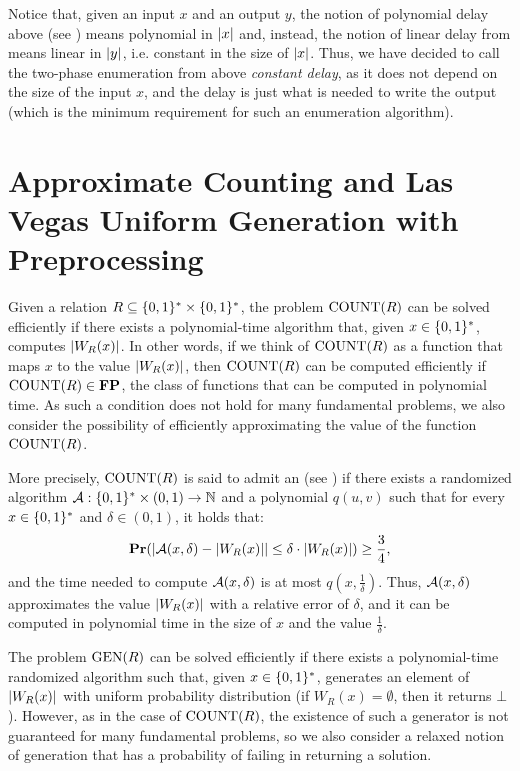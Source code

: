 \documentclass[11pt,twoside=off,numbers=noenddot]{scrbook}
\begin{document}
Notice that, given an input $x$ and an output $y$, the notion of polynomial delay above (see ) means polynomial in $| x |$ and, instead, the notion of linear delay from \cite{bagan2006mso,courcelle2009linear} means linear in $| y |$, i.e. constant in the size of $| x |$. Thus, we have decided to call the two-phase enumeration from above \emph{constant delay}, as it does not depend on the size of the input $x$, and the delay is just what is needed to write the output (which is the minimum requirement for such an enumeration algorithm).

\section{Approximate Counting and Las Vegas Uniform Generation with Preprocessing}
Given a relation $R \subseteq \{ 0, 1 \}^\ast \times \{ 0, 1 \}^\ast$, the problem $\text{COUNT}(R)$ can be solved efficiently if there exists a polynomial-time algorithm that, given $x \in \{ 0, 1 \}^\ast$, computes $| W_R(x) |$. In other words, if we think of $\text{COUNT}(R)$ as a function that maps $x$ to the value $| W_R(x) |$, then $\text{COUNT}(R)$ can be computed efficiently if $\text{COUNT}(R) \in \textbf{FP}$, the class of functions that can be computed in polynomial time. As such a condition does not hold for many fundamental problems, we also consider the possibility of efficiently approximating the value of the function $\text{COUNT}(R)$.

\begin{definition}[FPRAS]
    More precisely, $\text{COUNT}(R)$ is said to admit an  (see \cite{jerrum1986random}) if there exists a randomized algorithm $\mathcal{A} : \{ 0, 1 \}^\ast \times (0, 1) \to \mathbb N$ and a polynomial $q(u, v)$ such that for every $x \in \{ 0, 1 \}^\ast$ and $\delta \in (0, 1)$, it holds that:
    \[ \textbf{Pr}(| \mathcal{A}(x, \delta) - | W_R(x) | | \leq \delta \cdot | W_R(x) |) \geq \frac{3}{4}, \]
    and the time needed to compute $\mathcal{A}(x, \delta)$ is at most $q(x, \frac{1}{\delta})$. Thus, $\mathcal{A}(x, \delta)$ approximates the value $| W_R(x) |$ with a relative error of $\delta$, and it can be computed in polynomial time in the size of $x$ and the value $\frac{1}{\delta}$.
\end{definition}

The problem $\text{GEN}(R)$ can be solved efficiently if there exists a polynomial-time randomized algorithm such that, given $x \in \{ 0, 1 \}^\ast$, generates an element of $| W_R(x) |$ with uniform probability distribution (if $W_R(x) = \emptyset$, then it returns $\bot$). However, as in the case of $\text{COUNT}(R)$, the existence of such a generator is not guaranteed for many fundamental problems, so we also consider a relaxed notion of generation that has a probability of failing in returning a solution.
\end{document}
